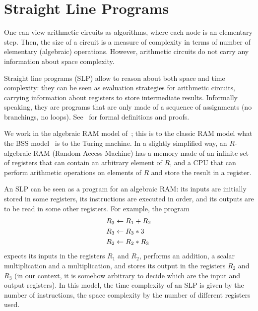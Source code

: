 

\section{Straight Line Programs}
\label{sec:stra-line-progr}

One can view arithmetic circuits as algorithms, where each node is an
elementary step. Then, the size of a circuit is a measure of
complexity in terms of number of elementary (algebraic)
operations. However, arithmetic circuits do not carry any information
about space complexity.

Straight line programs
(SLP) allow to reason about both
space and time complexity: they can be seen as evaluation strategies
for arithmetic circuits, carrying information about registers to store
intermediate results. Informally speaking, they are programs that are
only made of a sequence of assignments (no branchings, no loops).
See~\cite{burgisser+clausen-shokrollahi} for formal definitions and
proofs.

  We work in the
algebraic RAM model of~\cite{kaltofen88:gcd}; this is
to the classic RAM model what the BSS model~\cite{BSS} is to the
Turing machine. In a slightly simplified way, an $R$-algebraic RAM
(Random Access Machine) has a memory made of an infinite set of
registers that can contain an arbitrary element of $R$, and a CPU that
can perform arithmetic operations on elements of $R$ and store the
result in a register.

An SLP can be seen as a program for an algebraic RAM: its inputs are
initially stored in some registers, its instructions are executed in
order, and its outputs are to be read in some other registers. For
example, the program
\begin{equation}
  \label{eq:275}
  \begin{aligned}
    R_3 &\leftarrow R_1 + R_2\\
    R_3 &\leftarrow R_3 * 3\\
    R_2 &\leftarrow R_2 * R_3
  \end{aligned}
\end{equation}
expects its inputs in the registers $R_1$ and $R_2$, performs an
addition, a scalar multiplication and a multiplication, and stores its
output in the registers $R_2$ and $R_3$ (in our context, it is somehow
arbitrary to decide which are the input and output registers). In this
model, the time complexity of an SLP is given by the number of
instructions, the space complexity by the number of different
registers used.



